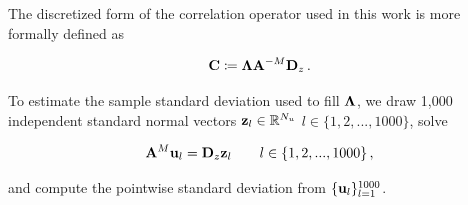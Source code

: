 The discretized form of the correlation operator used in this work is more
formally defined as
\begin{linenomath*}\begin{equation}
    \mathbf{C} \coloneqq \mathbf{\Lambda} \mathbf{A}^{-M} \mathbf{D}_z \, .
    \label{eq:corr_operator_fv}
\end{equation}\end{linenomath*}
To estimate the sample standard deviation used to fill $\mathbf{\Lambda}$, we
draw 1,000 independent standard normal vectors $\mathbf{z}_{l} \in \mathbb{R}^{N_{u}}$
$l\in \{1, 2, ..., 1000\}$, solve
\begin{linenomath*}\begin{equation}
    \mathbf{A}^{M} \mathbf{u}_{l} = \mathbf{D}_z \mathbf{z}_{l}
        \qquad l \in \{1, 2, ..., 1000\} \, ,
    \label{eq:sampling}
\end{equation}\end{linenomath*}
and compute the pointwise standard deviation from $\{\mathbf{u}_{l}\}_{l=1}^{1000}$.

